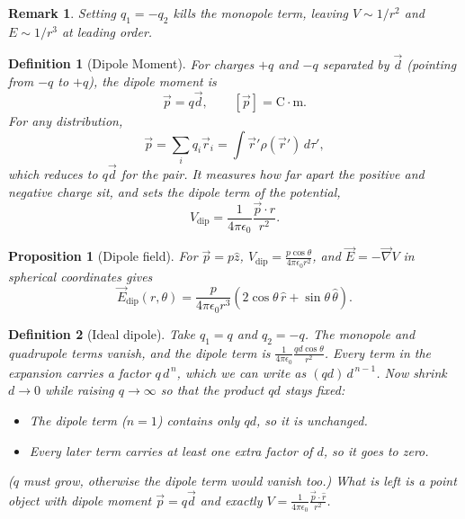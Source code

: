 \documentclass{article}
\newtheorem{definition}{Definition}
\newtheorem{remark}{Remark}
\newtheorem{proposition}{Proposition}
\begin{document}
\begin{remark}
    Setting $q_1 = -q_2$ kills the monopole term, leaving $V \sim 1/r^2$ and $E \sim 1/r^3$ at leading order.
\end{remark}
\begin{definition}[Dipole Moment]
    For charges $+q$ and $-q$ separated by $\vec{d}$ (pointing from $-q$ to $+q$), the dipole moment is
    \begin{equation}
        \vec{p} = q\vec{d}, \qquad [\vec{p}] = \mathrm{C\cdot m}.
    \end{equation}
    For any distribution,
    \begin{equation}
        \vec{p} = \sum_i q_i\vec{r}_i = \int\vec{r}'\rho(\vec{r}')\,d\tau',
    \end{equation}
    which reduces to $q\vec{d}$ for the pair. It measures how far apart the positive and negative charge sit, and sets the dipole term of the potential,
    \begin{equation}
        V_{\text{dip}} = \frac{1}{4\pi\epsilon_0}\frac{\vec{p}\cdot\hat{r}}{r^2}.
    \end{equation}
\end{definition}
\begin{proposition}[Dipole field]
    For $\vec{p} = p\hat{z}$, $V_{\text{dip}} = \frac{p\cos\theta}{4\pi\epsilon_0r^2}$, and $\vec{E} = -\vec{\nabla}V$ in spherical coordinates gives
    \begin{equation}
        \vec{E}_{\text{dip}}(r,\theta) = \frac{p}{4\pi\epsilon_0r^3}\left(2\cos\theta\,\hat{r} + \sin\theta\,\hat{\theta}\right).
    \end{equation}
\end{proposition}
\begin{definition}[Ideal dipole]
    Take $q_1 = q$ and $q_2 = -q$. The monopole and quadrupole terms vanish, and the dipole term is $\frac{1}{4\pi\epsilon_0}\frac{qd\cos\theta}{r^2}$. Every term in the expansion carries a factor $q\,d^{\,n}$, which we can write as $(qd)\,d^{\,n-1}$. Now shrink $d \to 0$ while raising $q \to \infty$ so that the product $qd$ stays fixed:
    \begin{itemize}
        \item The dipole term ($n=1$) contains only $qd$, so it is unchanged.
        \item Every later term carries at least one extra factor of $d$, so it goes to zero.
    \end{itemize}
    ($q$ must grow, otherwise the dipole term would vanish too.) What is left is a point object with dipole moment $\vec{p} = q\vec{d}$ and exactly $V = \frac{1}{4\pi\epsilon_0}\frac{\vec{p}\cdot\hat{r}}{r^2}$.
\end{definition}
\end{document}
